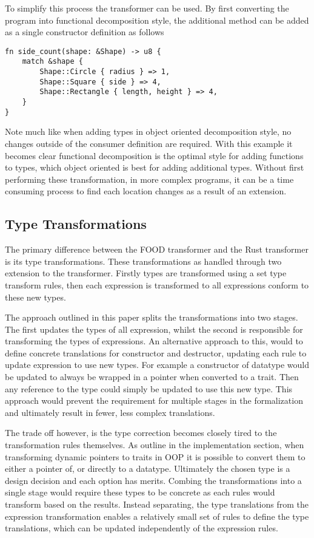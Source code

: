 \documentclass[ oneside,%
                    author={James Elgar},
                    degree={MEng},
                     title={Bidirectional transformer between functional and \\ object-oriented programming in Rust},
                  subtitle={}]{dissertation}
\begin{document}
To simplify this process the transformer can be used. By first converting the program into functional decomposition style, the additional method can be added as a single constructor definition as follows

\begin{verbatim}
fn side_count(shape: &Shape) -> u8 {
    match &shape {
        Shape::Circle { radius } => 1,
        Shape::Square { side } => 4,
        Shape::Rectangle { length, height } => 4, 
    }
}
\end{verbatim}

Note much like when adding types in object oriented decomposition style, no changes outside of the consumer definition are required. With this example it becomes clear functional decomposition is the optimal style for adding functions to types, which object oriented is best for adding additional types. Without first performing these transformation, in more complex programs, it can be a time consuming process to find each location changes as a result of an extension.

\subsection{Type Transformations}

The primary difference between the FOOD transformer and the Rust transformer is its type transformations. These transformations as handled through two extension to the transformer. Firstly types are transformed using a set type transform rules, then each expression is transformed to all expressions conform to these new types.

The approach outlined in this paper splits the transformations into two stages. The first updates the types of all expression, whilst the second is responsible for transforming the types of expressions. An alternative approach to this, would to define concrete translations for constructor and destructor, updating each rule to update expression to use new types. 
For example a constructor of datatype would be updated to always be wrapped in a pointer when converted to a trait. Then any reference to the type could simply be updated to use this new type.
This approach would prevent the requirement for multiple stages in the formalization and ultimately result in fewer, less complex translations. 

The trade off however, is the type correction becomes closely tired to the transformation rules themselves. As outline in the implementation section, when transforming dynamic pointers to traits in OOP it is possible to convert them to either a pointer of, or directly to a datatype. Ultimately the chosen type is a design decision and each option has merits.
Combing the transformations into a single stage would require these types to be concrete as each rules would transform based on the results. Instead separating, the type translations from the expression transformation enables a relatively small set of rules to define the type translations, which can be updated independently of the expression rules.
\end{document}
